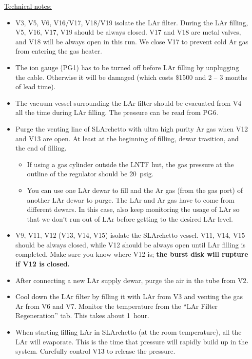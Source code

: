 \documentclass[letterpaper,11pt]{article}
\begin{document}
\underline{Technical notes:}
\begin{itemize}
\setlength\itemsep{-0.2em}
\item V3, V5, V6, V16/V17, V18/V19 isolate the LAr filter.
During the LAr filling, V5, V16, V17, V19 should be always closed.
V17 and V18 are metal valves, and V18 will be always open in this run.
We close V17 to prevent cold Ar gas from entering the gas heater.
\item The ion gauge (PG1) has to be turned off before LAr filling by unplugging the cable.
Otherwise it will be damaged (which costs \$1500 and 2 -- 3 months of lead time).
\item The vacuum vessel surrounding the LAr filter should be evacuated from V4 all the time during LAr filling.  
The pressure can be read from PG6.
\item Purge the venting line of SLArchetto with ultra high purity Ar gas when V12 and V13 are open.
At least at the beginning of filling, dewar trasition, and the end of filling.
    \begin{itemize}
        \item If using a gas cylinder outside the LNTF hut, the gas pressure at the outline of the regulator 
        should be 20~psig.
        \item You can use one LAr dewar to fill and the Ar gas (from the gas port) of another LAr dewar to purge.
        The LAr and Ar gas have to come from different dewars.
        In this case, also keep monitoring the usage of LAr so that we don't run out of LAr before getting to
        the desired LAr level.
    \end{itemize}
\item V9, V11, V12 (V13, V14, V15) isolate the SLArchetto vessel.  
V11, V14, V15 should be always closed, while V12 should be always open until LAr filling is completed.  
Make sure you know where V12 is; \textbf{the burst disk will rupture if V12 is closed.}
\item After connecting a new LAr supply dewar, purge the air in the tube from V2.
\item Cool down the LAr filter by filling it with LAr from V3 and venting the gas Ar from V6 and V7.  
Monitor the temperature from the ``LAr Filter Regeneration'' tab.  This takes about 1~hour.
\item When starting filling LAr in SLArchetto (at the room temperature), all the LAr will evaporate.  
This is the time that pressure will rapidly build up in the system.  
Carefully control V13 to release the pressure.

\end{itemize}
\end{document}

